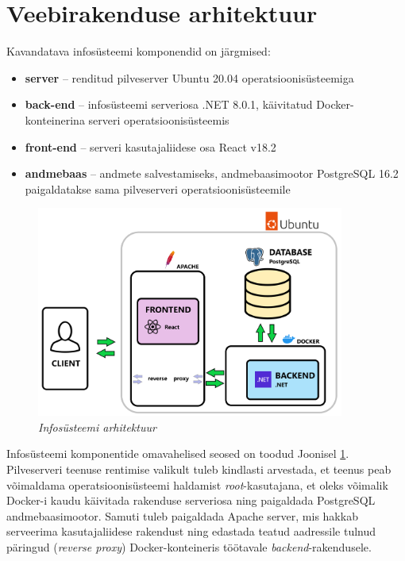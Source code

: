 \section{Veebirakenduse arhitektuur}
\label{chapters:analysis_architecture}
Kavandatava infosüsteemi komponendid on järgmised:
\begin{itemize}
    \item \textbf{server} -- renditud pilveserver Ubuntu 20.04 operatsioonisüsteemiga
    \item \textbf{back-end} -- infosüsteemi serveriosa .NET 8.0.1, käivitatud Docker-konteinerina serveri operatsioonisüsteemis
    \item \textbf{front-end} -- serveri kasutajaliidese osa React v18.2
    \item \textbf{andmebaas} -- andmete salvestamiseks, andmebaasimootor PostgreSQL 16.2 paigaldatakse sama pilveserveri operatsioonisüsteemile
\end{itemize}

\begin{figure}[ht]
    \centering
    \includegraphics[width=0.9\textwidth]{figures/analysis/architecture.png}
    \caption[Infosüsteemi arhitektuur]{\textit{Infosüsteemi arhitektuur}}
    \label{fig:architecture}
\end{figure}

Infosüsteemi komponentide omavahelised seosed on toodud Joonisel \ref{fig:architecture}.
Pilveserveri teenuse rentimise valikult tuleb kindlasti arvestada, et teenus peab võimaldama operatsioonisüsteemi
haldamist \textit{root}-kasutajana, et oleks võimalik Docker-i kaudu käivitada rakenduse serveriosa ning
paigaldada PostgreSQL andmebaasimootor. Samuti tuleb paigaldada Apache server, mis hakkab 
serveerima kasutajaliidese rakendust ning edastada teatud aadressile tulnud päringud (\textit{reverse proxy})
Docker-konteineris töötavale \textit{backend}-rakendusele.